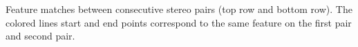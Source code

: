 \label{fig:along_track} Feature matches between consecutive stereo pairs (top row and bottom row). The colored lines start and end points correspond to the same feature on the first pair and second pair. 
  